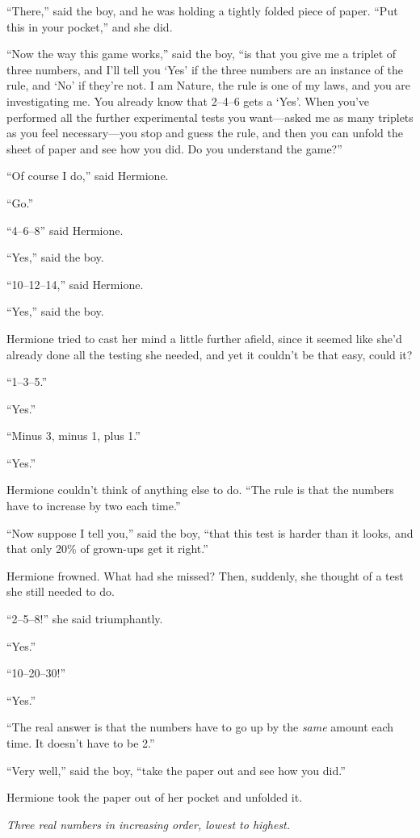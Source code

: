 “There,” said the boy, and he was holding a tightly folded piece of paper. “Put this in your pocket,” and she did.

“Now the way this game works,” said the boy, “is that you give me a triplet of three numbers, and I’ll tell you ‘Yes’ if the three numbers are an instance of the rule, and ‘No’ if they’re not. I am Nature, the rule is one of my laws, and you are investigating me. You already know that 2–4–6 gets a ‘Yes’. When you’ve performed all the further experimental tests you want—asked me as many triplets as you feel necessary—you stop and guess the rule, and then you can unfold the sheet of paper and see how you did. Do you understand the game?”

“Of course I do,” said Hermione.

“Go.”

“4–6–8” said Hermione.

“Yes,” said the boy.

“10–12–14,” said Hermione.

“Yes,” said the boy.

Hermione tried to cast her mind a little further afield, since it seemed like she’d already done all the testing she needed, and yet it couldn’t be that easy, could it?

“1–3–5.”

“Yes.”

“Minus 3, minus 1, plus 1.”

“Yes.”

Hermione couldn’t think of anything else to do. “The rule is that the numbers have to increase by two each time.”

“Now suppose I tell you,” said the boy, “that this test is harder than it looks, and that only 20\% of grown-ups get it right.”

Hermione frowned. What had she missed? Then, suddenly, she thought of a test she still needed to do.

“2–5–8!” she said triumphantly.

“Yes.”

“10–20–30!”

“Yes.”

“The real answer is that the numbers have to go up by the \emph{same} amount each time. It doesn’t have to be 2.”

“Very well,” said the boy, “take the paper out and see how you did.”

Hermione took the paper out of her pocket and unfolded it.

\emph{Three real numbers in increasing order, lowest to highest.}

